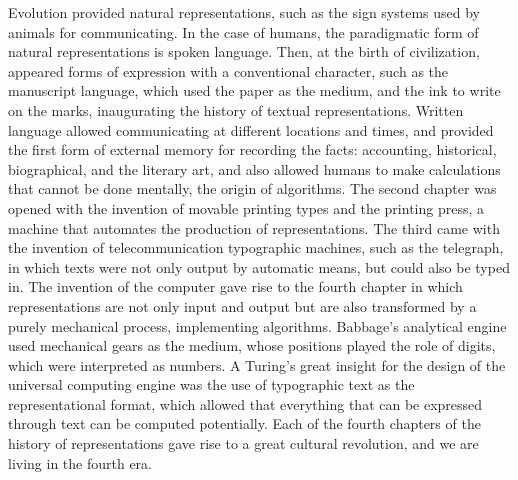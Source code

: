 \documentclass[11pt]{article}
\begin{document}
Evolution provided natural representations, such as the sign systems used by animals for communicating. In the case of humans, the paradigmatic form of natural representations is spoken language. Then, at the birth of civilization, appeared forms of expression with a conventional character, such as the manuscript language, which used the paper as the medium, and the ink to write on the marks, inaugurating the history of textual representations. Written language allowed communicating at different locations and times, and provided the first form of external memory for recording the facts: accounting, historical, biographical, and the literary art, and also allowed humans to make calculations that cannot be done mentally, the origin of algorithms. The second chapter was opened with the invention of movable printing types and the printing press, a machine that automates the production of representations. The third came with the invention of telecommunication typographic machines, such as the telegraph, in which texts were not only output by automatic means, but could also be typed in. The invention of the computer gave rise to the fourth chapter in which representations are not only input and output but are also transformed by a purely mechanical process, implementing algorithms. Babbage's analytical engine used mechanical gears as the medium, whose positions played the role of digits, which were interpreted as numbers. A Turing's great insight for the design of the universal computing engine was the use of typographic text as the representational format, which allowed that everything that can be expressed through text can be computed potentially. Each of the fourth chapters of the history of representations gave rise to a great cultural revolution, and we are living in the fourth era.
\end{document}
